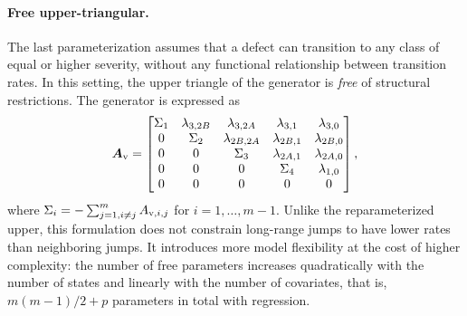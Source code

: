 \documentclass{article}
\newcommand{\RN}[1]{\textup{\uppercase\expandafter{\romannumeral#1}}}
\begin{document}
\paragraph{Free upper-triangular.}
The last parameterization assumes that a defect can transition to any class of equal or higher severity, without any functional relationship between transition rates. In this setting, the upper triangle of the generator is \textit{free} of structural restrictions. The generator is expressed as
\begin{align}
    \bm{A}_{\RN{5}} =
    \begin{bmatrix} 
    \Sigma_1 & \lambda_{3,2B} & \lambda_{3, 2A} & \lambda_{3, 1} & \lambda_{3, 0} \\
    0 & \Sigma_2 & \lambda_{2B, 2A} & \lambda_{2B, 1} & \lambda_{2B, 0} \\
    0 & 0 & \Sigma_3 & \lambda_{2A, 1} & \lambda_{2A, 0} \\
    0 & 0 & 0 & \Sigma_4 & \lambda_{1, 0} \\
    0 & 0 & 0 & 0 & 0 \\
    \end{bmatrix}, \label{eq:generator_free_upper}
\end{align}
where $\Sigma_i = -\sum_{j=1, i \neq j}^m A_{\RN{5},i,j}$ for $i = 1, \dots, m-1$.
Unlike the reparameterized upper, this formulation does not constrain long-range jumps to have lower rates than neighboring jumps. It introduces more model flexibility at the cost of higher complexity: the number of free parameters increases quadratically with the number of states and linearly with the number of covariates, that is, $m(m-1)/2+p$ parameters in total with regression.
\end{document}
